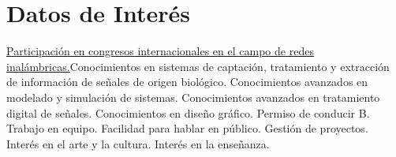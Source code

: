 \documentclass[11pt,a4paper,sans,spanish]{moderncv}
\begin{document}
\section{Datos de Interés}
\href{http://ieeexplore.ieee.org/stamp/stamp.jsp?tp=&arnumber=7733012&isnumber=7732953}{Participación en congresos internacionales en el campo de redes inalámbricas.}\quad Conocimientos en sistemas de captación, tratamiento y extracción de información de señales de origen biológico.\quad
Conocimientos avanzados en modelado y simulación de sistemas.\quad
Conocimientos avanzados en tratamiento digital de señales.\quad
Conocimientos en diseño gráfico.\quad
Permiso de conducir B. \quad{} Trabajo en equipo. \quad{} Facilidad para hablar en público. \quad{} Gestión de proyectos. \quad{} Interés en el arte y la cultura. \quad{} Interés en la enseñanza.
\end{document}
